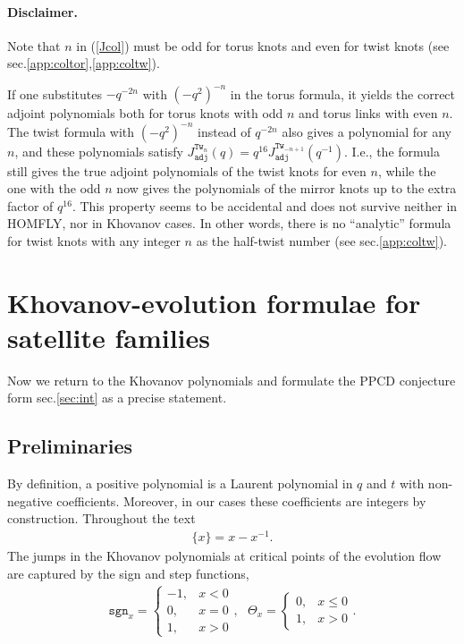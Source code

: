 \documentclass[11pt]{article}
\def\be{\begin{eqnarray}}
\def\ee{\end{eqnarray}}
\def\Tw{\mathtt{Tw}}
\def\adj{\mathtt{adj}}
\def\sgn{\mathtt{sgn}}
\begin{document}


\paragraph{Disclaimer.} Note that $n$ in (\ref{Jcol}) must be odd for torus knots and even for twist knots (see sec.\ref{app:coltor},\ref{app:coltw}). 

If one substitutes $-q^{-2n}$ with  $(-q^2)^{-n}$ in the torus formula, it yields the correct adjoint polynomials both for torus knots with odd $n$ and torus links with even $n$. The twist formula with $(-q^2)^{-n}$ instead of $q^{-2n}$ also gives a polynomial for any $n$, and these polynomials satisfy $J^{\Tw_n}_{\adj}(q)=q^{16}J^{\Tw_{-n+1}}_{\adj}(q^{-1})$. I.e., the formula still gives the true adjoint polynomials of the twist knots for even $n$, while the one with the odd $n$ now gives the polynomials of the mirror knots up to the extra factor of $q^{16}$. This property seems to be accidental and does not survive neither in HOMFLY, nor in Khovanov cases. In other words, there is no ``analytic'' formula for twist knots with any integer $n$ as the half-twist number (see sec.\ref{app:coltw}).


\section{Khovanov-evolution formulae for satellite families\label{sec:Khsat}}
Now we return to the Khovanov polynomials and formulate the PPCD conjecture form sec.\ref{sec:int} as a precise statement.
\subsection{Preliminaries}
By definition, a positive polynomial is a Laurent polynomial in $q$ and $t$ with non-negative coefficients. Moreover, in our cases these coefficients are integers by construction. Throughout the text \be\{x\}=x-x^{-1}.\label{figx}\ee
The jumps in the Khovanov polynomials at critical points of the evolution flow are captured by the sign and step functions, 
\be
\sgn_x=\left\{\begin{array}{cl}-1,&x<0\\0,&x=0\\1,&x>0\end{array}\right.,\ \ \
\Theta_x=\left\{\begin{array}{cl}0,&x\le0\\1,&x> 0\end{array}\right..
\ee
\end{document}
